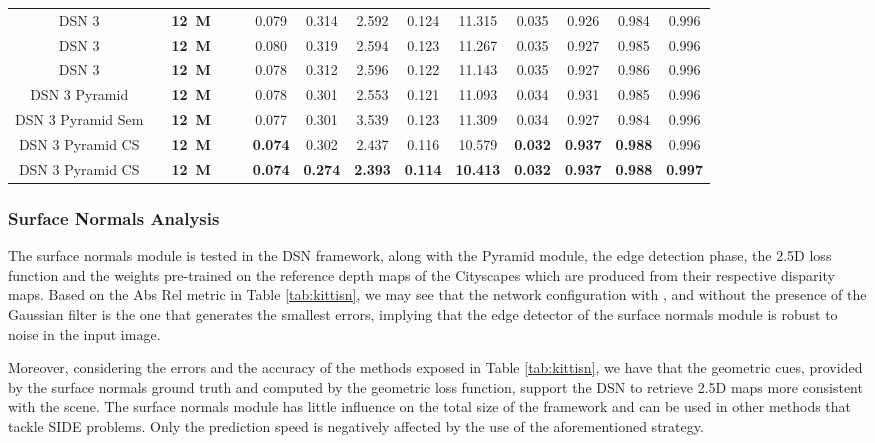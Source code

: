 \documentclass[5p]{elsarticle}
\begin{document}
\begin{table*}[]
{\begin{tabular}{c|c|c|c|c|cccccc|ccc}
DSN 3 &  & \textbf{12\ M} &  &  & 0.079 & 0.314 & 2.592 & 0.124 & 11.315 & 0.035 & 0.926 & 0.984 & 0.996 \\
DSN 3 &    & \textbf{12\ M} &  &  & 0.080 & 0.319 & 2.594 & 0.123 & 11.267 & 0.035 & 0.927 & 0.985 & 0.996\\
DSN 3 &  & \textbf{12\ M} &  &  & 0.078 & 0.312 & 2.596 & 0.122 & 11.143 & 0.035 & 0.927 & 0.986 & 0.996 \\
DSN 3  Pyramid &  & \textbf{12\ M} &  &  & 0.078 & 0.301 & 2.553 & 0.121 & 11.093 & 0.034 & 0.931 & 0.985 & 0.996 \\
DSN 3  Pyramid  Sem &  & \textbf{12\ M} &  &  & 0.077 & 0.301 & 3.539 & 0.123 & 11.309 & 0.034 & 0.927 & 0.984 & 0.996 \\
DSN 3  Pyramid  CS &  & \textbf{12\ M} &  &  & \textbf{0.074} & 0.302 & 2.437 & 0.116 & 10.579 & \textbf{0.032} & \textbf{0.937} & \textbf{0.988} & 0.996 \\
DSN 3  Pyramid  CS &  & \textbf{12\ M} &  &  & \textbf{0.074} & \textbf{0.274} & \textbf{2.393} & \textbf{0.114} & \textbf{10.413} & \textbf{0.032} & \textbf{0.937} & \textbf{0.988} & \textbf{0.997} \\\hline
\end{tabular}
}
\end{table*}

\subsubsection{Surface Normals Analysis}

The surface normals module is tested in the DSN  framework, along with the Pyramid module, the edge detection phase, the 2.5D loss function and the weights pre-trained on the reference depth maps of the Cityscapes \cite{cordts2016cityscapes} which are produced from their respective disparity maps. Based on the Abs Rel metric in Table \ref{tab:kittisn}, we may see that the network configuration with ,  and without the presence of the Gaussian filter is the one that generates the smallest errors, implying that the edge detector of the surface normals module is robust to noise in the input image. 

Moreover, considering the errors and the accuracy of the methods exposed in Table \ref{tab:kittisn}, we have that the geometric cues, provided by the surface normals ground truth and computed by the geometric loss function, support the DSN to retrieve 2.5D maps more consistent with the scene. The surface normals module has little influence on the total size of the framework and can be used in other methods that tackle SIDE problems. Only the prediction speed is negatively affected by the use of the aforementioned strategy.
\end{document}
